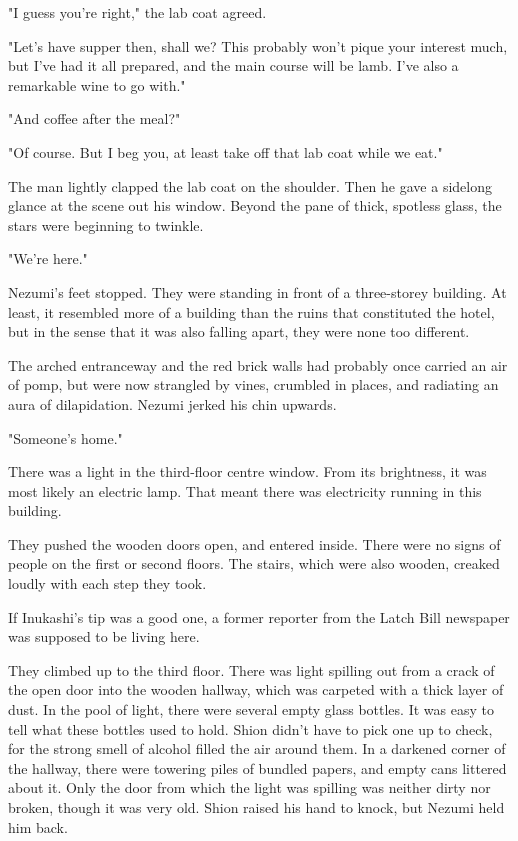 "I guess you're right," the lab coat agreed.

"Let's have supper then, shall we? This probably won't pique your
interest much, but I've had it all prepared, and the main course will be
lamb. I've also a remarkable wine to go with."

"And coffee after the meal?"

"Of course. But I beg you, at least take off that lab coat while we
eat."

The man lightly clapped the lab coat on the shoulder. Then he gave a
sidelong glance at the scene out his window. Beyond the pane of thick,
spotless glass, the stars were beginning to twinkle.

\mybreak

"We're here."

Nezumi's feet stopped. They were standing in front of a three-storey
building. At least, it resembled more of a building than the ruins that
constituted the hotel, but in the sense that it was also falling apart,
they were none too different.

The arched entranceway and the red brick walls had probably once carried
an air of pomp, but were now strangled by vines, crumbled in places, and
radiating an aura of dilapidation. Nezumi jerked his chin upwards.

"Someone's home."

\myspace

There was a light in the third-floor centre window. From its brightness,
it was most likely an electric lamp. That meant there was electricity
running in this building.

They pushed the wooden doors open, and entered inside. There were no
signs of people on the first or second floors. The stairs, which were
also wooden, creaked loudly with each step they took.

If Inukashi's tip was a good one, a former reporter from the Latch Bill
newspaper was supposed to be living here.

They climbed up to the third floor. There was light spilling out from a
crack of the open door into the wooden hallway, which was carpeted with
a thick layer of dust. In the pool of light, there were several empty
glass bottles. It was easy to tell what these bottles used to hold.
Shion didn't have to pick one up to check, for the strong smell of
alcohol filled the air around them. In a darkened corner of the hallway,
there were towering piles of bundled papers, and empty cans littered
about it. Only the door from which the light was spilling was neither
dirty nor broken, though it was very old. Shion raised his hand to
knock, but Nezumi held him back.

